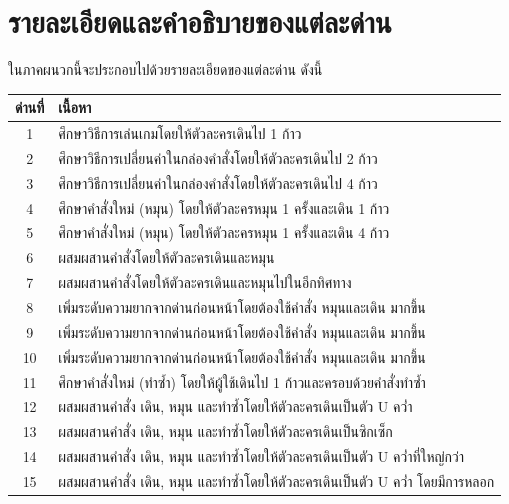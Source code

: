 \chapter{รายละเอียดและคำอธิบายของแต่ละด่าน}
ในภาคผนวกนี้จะประกอบไปด้วยรายละเอียดของแต่ละด่าน ดังนี้
\begin{table}[H]
    \begin{center}
        \begin{tabularx}{\textwidth}{|c | X|} 
            \hline
            ด่านที่ & เนื้อหา\\ [0.5ex] 
            \hline\hline
            1 &  ศึกษาวิธีการเล่นเกมโดยให้ตัวละครเดินไป 1 ก้าว \\ 
            \hline
            2 &  ศึกษาวิธีการเปลี่ยนค่าในกล่องคำสั่งโดยให้ตัวละครเดินไป 2 ก้าว \\ 
            \hline
            3 &  ศึกษาวิธีการเปลี่ยนค่าในกล่องคำสั่งโดยให้ตัวละครเดินไป 4 ก้าว \\ 
            \hline
            4 &  ศึกษาคำสั่งใหม่ (หมุน) โดยให้ตัวละครหมุน 1 ครั้งและเดิน 1 ก้าว \\ 
            \hline
            5 &  ศึกษาคำสั่งใหม่ (หมุน) โดยให้ตัวละครหมุน 1 ครั้งและเดิน 4 ก้าว \\ 
            \hline
            6 &  ผสมผสานคำสั่งโดยให้ตัวละครเดินและหมุน \\ 
            \hline
            7 &  ผสมผสานคำสั่งโดยให้ตัวละครเดินและหมุนไปในอีกทิศทาง \\ 
            \hline
            8 &  เพิ่มระดับความยากจากด่านก่อนหน้าโดยต้องใช้คำสั่ง หมุนและเดิน มากขึ้น \\ 
            \hline
            9 &  เพิ่มระดับความยากจากด่านก่อนหน้าโดยต้องใช้คำสั่ง หมุนและเดิน มากขึ้น \\ 
            \hline
            10 &  เพิ่มระดับความยากจากด่านก่อนหน้าโดยต้องใช้คำสั่ง หมุนและเดิน มากขึ้น \\ 
            \hline
            11 &  ศึกษาคำสั่งใหม่ (ทำซ้ำ) โดยให้ผู้ใช้เดินไป 1 ก้าวและครอบด้วยคำสั่งทำซ้ำ \\ 
            \hline
            12 &  ผสมผสานคำสั่ง เดิน, หมุน และทำซ้ำโดยให้ตัวละครเดินเป็นตัว U คว่ำ \\ 
            \hline
            13 &  ผสมผสานคำสั่ง เดิน, หมุน และทำซ้ำโดยให้ตัวละครเดินเป็นซิกเซ็ก \\ 
            \hline
            14 &  ผสมผสานคำสั่ง เดิน, หมุน และทำซ้ำโดยให้ตัวละครเดินเป็นตัว U คว่ำที่ใหญ่กว่า \\ 
            \hline
            15 &  ผสมผสานคำสั่ง เดิน, หมุน และทำซ้ำโดยให้ตัวละครเดินเป็นตัว U คว่ำ โดยมีการหลอก \\ 

\end{tabularx}
\end{center}
\end{table}
